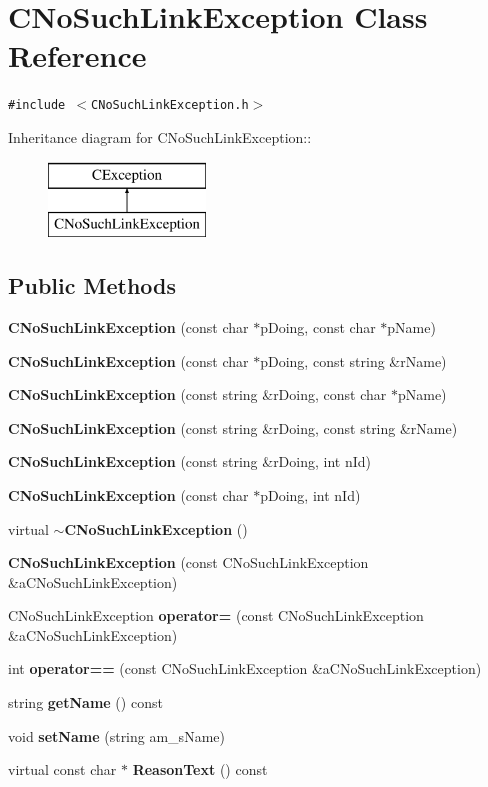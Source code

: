 \section{CNo\-Such\-Link\-Exception  Class Reference}
\label{classCNoSuchLinkException}
{\tt \#include $<$CNo\-Such\-Link\-Exception.h$>$}

Inheritance diagram for CNo\-Such\-Link\-Exception::\begin{figure}[H]
\begin{center}
\leavevmode
\includegraphics[height=2cm]{classCNoSuchLinkException}
\end{center}
\end{figure}
\subsection*{Public Methods}
\begin{CompactItemize}
\item 
{\bf CNo\-Such\-Link\-Exception} (const char $\ast$p\-Doing, const char $\ast$p\-Name)
\item 
{\bf CNo\-Such\-Link\-Exception} (const char $\ast$p\-Doing, const string \&r\-Name)
\item 
{\bf CNo\-Such\-Link\-Exception} (const string \&r\-Doing, const char $\ast$p\-Name)
\item 
{\bf CNo\-Such\-Link\-Exception} (const string \&r\-Doing, const string \&r\-Name)
\item 
{\bf CNo\-Such\-Link\-Exception} (const string \&r\-Doing, int n\-Id)
\item 
{\bf CNo\-Such\-Link\-Exception} (const char $\ast$p\-Doing, int n\-Id)
\item 
virtual {\bf $\sim$CNo\-Such\-Link\-Exception} ()
\item 
{\bf CNo\-Such\-Link\-Exception} (const CNo\-Such\-Link\-Exception \&a\-CNo\-Such\-Link\-Exception)
\item 
CNo\-Such\-Link\-Exception {\bf operator=} (const CNo\-Such\-Link\-Exception \&a\-CNo\-Such\-Link\-Exception)
\item 
int {\bf operator==} (const CNo\-Such\-Link\-Exception \&a\-CNo\-Such\-Link\-Exception)
\item 
string {\bf get\-Name} () const
\item 
void {\bf set\-Name} (string am\_\-s\-Name)
\item 
virtual const char $\ast$ {\bf Reason\-Text} () const
\end{CompactItemize}
